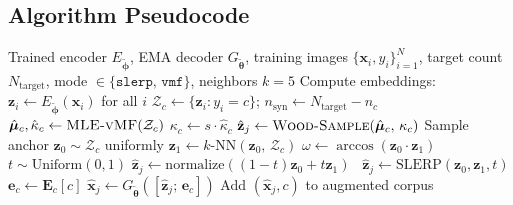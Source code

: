 \documentclass[12pt,letterpaper]{article}
\newcommand{\bz}{\mathbf{z}}
\newcommand{\bx}{\mathbf{x}}
\newcommand{\btheta}{\bm{\theta}}
\newcommand{\bphi}{\bm{\phi}}
\newcommand{\bmu}{\bm{\mu}}
\begin{document}

\subsection{Algorithm Pseudocode}

\begin{algorithm}[H]
\caption{Dual-Mode Oversampling (Inference)}
\label{alg:oversample}
\begin{algorithmic}[1]
\Require Trained encoder $E_{\tilde{\bphi}}$, EMA decoder $G_{\tilde{\btheta}}$,
         training images $\{\bx_i, y_i\}_{i=1}^N$, target count $N_{\text{target}}$,
         mode $\in \{\texttt{slerp},\, \texttt{vmf}\}$, neighbors $k=5$
\State Compute embeddings: $\bz_i \leftarrow E_{\tilde{\bphi}}(\bx_i)$ for all $i$
  \State $\mathcal{Z}_c \leftarrow \{\bz_i : y_i = c\}$;\quad
         $n_{\text{syn}} \leftarrow N_{\text{target}} - n_c$
    \State $\hat{\bmu}_c, \hat{\kappa}_c \leftarrow
      \textsc{MLE-vMF}(\mathcal{Z}_c)$
    \State $\kappa_c \leftarrow s \cdot \hat{\kappa}_c$
      \State $\hat{\bz}_j \leftarrow \textsc{Wood-Sample}
        (\hat{\bmu}_c,\, \kappa_c)$
    \EndFor
  \Else {}
      \State Sample anchor $\bz_0 \sim \mathcal{Z}_c$ uniformly
      \State $\bz_1 \leftarrow k\text{-NN}(\bz_0,\, \mathcal{Z}_c)$
      \State $\omega \leftarrow \arccos(\bz_0 \cdot \bz_1)$
      \State $t \sim \text{Uniform}(0,1)$
        $\hat{\bz}_j \leftarrow \text{normalize}((1-t)\bz_0 + t\bz_1)$
      \Else\
        $\hat{\bz}_j \leftarrow \text{SLERP}(\bz_0, \bz_1, t)$
      \EndIf
    \EndFor
  \EndIf
  \State $\bm{e}_c \leftarrow \mathbf{E}_c[c]$
  \For{each $\hat{\bz}_j$}
    \State $\hat{\bx}_j \leftarrow G_{\tilde{\btheta}}
      ([\hat{\bz}_j;\, \bm{e}_c])$
    \State Add $(\hat{\bx}_j, c)$ to augmented corpus
  \EndFor
\EndFor
\end{algorithmic}
\end{algorithm}
\end{document}

